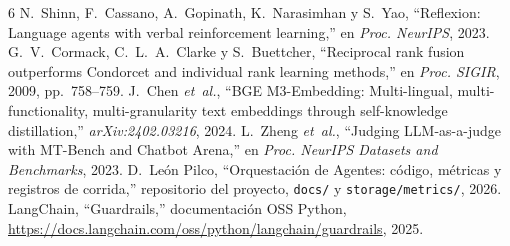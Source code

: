 \documentclass[journal]{IEEEtran}
\begin{document}
\begin{thebibliography}{6}
N.~Shinn, F.~Cassano, A.~Gopinath, K.~Narasimhan y S.~Yao, ``Reflexion: Language agents
with verbal reinforcement learning,'' en \emph{Proc. NeurIPS}, 2023.
G.~V.~Cormack, C.~L.~A.~Clarke y S.~Buettcher, ``Reciprocal rank fusion outperforms
Condorcet and individual rank learning methods,'' en \emph{Proc. SIGIR}, 2009,
pp.~758--759.
J.~Chen \emph{et~al.}, ``BGE M3-Embedding: Multi-lingual, multi-functionality,
multi-granularity text embeddings through self-knowledge distillation,''
\emph{arXiv:2402.03216}, 2024.
L.~Zheng \emph{et~al.}, ``Judging LLM-as-a-judge with MT-Bench and Chatbot Arena,'' en
\emph{Proc. NeurIPS Datasets and Benchmarks}, 2023.
D.~León Pilco, ``Orquestación de Agentes: código, métricas y registros de corrida,''
repositorio del proyecto, \texttt{docs/} y \texttt{storage/metrics/}, 2026.
LangChain, ``Guardrails,'' documentación OSS Python,
\url{https://docs.langchain.com/oss/python/langchain/guardrails}, 2025.
\end{thebibliography}
\end{document}
